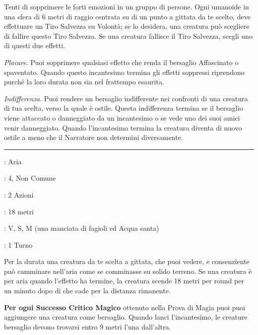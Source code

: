 \begin{multicols}{2}
Tenti di sopprimere le forti emozioni in un gruppo di persone. Ogni umanoide in una sfera di 6 metri di raggio centrata su di un punto a gittata da te scelto, deve effettuare un Tiro Salvezza su Volontà; se lo desidera, una creatura può scegliere di fallire questo Tiro Salvezza. Se una creatura fallisce il Tiro Salvezza, scegli uno di questi due effetti.

\emph{Placare}. Puoi sopprimere qualsiasi effetto che renda il bersaglio Affascinato o spaventato. Quando questo incantesimo termina gli effetti soppressi riprendono purché la loro durata non sia nel frattempo esaurita.

\emph{Indifferenza}. Puoi rendere un bersaglio indifferente nei confronti di una creatura di tua scelta, verso la quale è ostile. Questa indifferenza termina se il bersaglio viene attaccato o danneggiato da un incantesimo o se vede uno dei suoi amici venir danneggiato. Quando l'incantesimo termina la creatura diventa di nuovo ostile a meno che il Narratore non determini diversamente.

\smallskip\noindent\rule{\linewidth}{2pt} \hypertarget{Camminare nell'aria}{}\smallskip{}
\noindent
\begin{description}[noitemsep, topsep=0pt, parsep=0pt, partopsep=0pt, leftmargin=0cm, labelwidth=2.8cm]
	\item[\textbf{Lista di Magia}]: Aria
	\item[\textbf{Livello}]: 4, Non Comune
	\item[\textbf{T. di Lancio}]: 2 Azioni
	\item[\textbf{Gittata}]: 18 metri
	\item[\textbf{Componenti}]: V, S, M (una manciata di fagioli ed Acqua santa)
	\item[\textbf{Durata}]: 1 Turno
\end{description}

Per la durata una creatura da te scelta a gittata, che puoi vedere, e consenziente può camminare nell'aria come se comminasse su solido terreno. Se una creatura è per aria quando l'effetto ha termine, la creatura scende 18 metri per round per un minuto dopo di che cade per la distanza rimanente.

\textbf{Per ogni Successo Critico Magico} ottenuto nella Prova di Magia puoi puoi aggiungere una creatura come bersaglio. Quando lanci l'incantesimo, le creature bersaglio devono trovarsi entro 9 metri l'una dall'altra.


\end{multicols}
